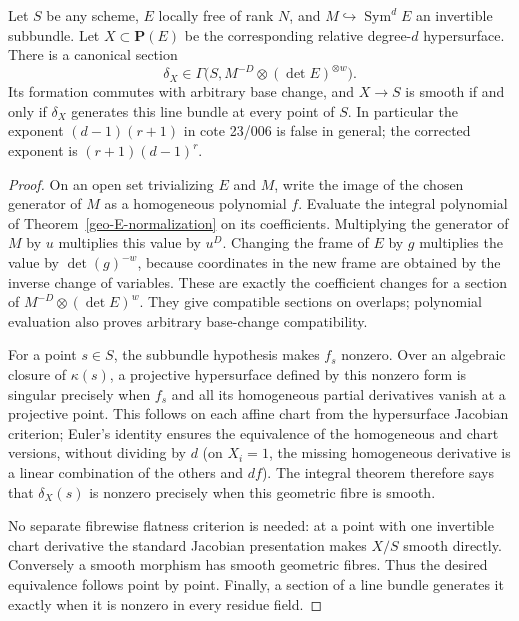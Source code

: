 \begin{theorem}
\label{geo-E-relative}
Let $S$ be any scheme, $E$ locally free of rank $N$, and
$M\hookrightarrow\operatorname{Sym}^d E$ an invertible subbundle. Let
$X\subset\mathbf P(E)$ be the corresponding relative degree-$d$ hypersurface.
There is a canonical section
\[
 \delta_X\in
 \Gamma\bigl(S,M^{-D}\otimes(\det E)^{\otimes w}\bigr).
\]
Its formation commutes with arbitrary base change, and $X\to S$ is smooth
if and only if $\delta_X$ generates this line bundle at every point of $S$.
In particular the exponent $(d-1)(r+1)$ in cote 23/006 is false in general;
the corrected exponent is $(r+1)(d-1)^r$.
\end{theorem}
\begin{proof}
On an open set trivializing $E$ and $M$, write the image of the chosen generator
of $M$ as a homogeneous polynomial $f$. Evaluate the integral polynomial of
Theorem~\ref{geo-E-normalization} on its coefficients. Multiplying the generator
of $M$ by $u$ multiplies this value by $u^D$. Changing the frame of $E$ by $g$
multiplies the value by $\det(g)^{-w}$, because coordinates in the new frame
are obtained by the inverse change of variables. These are exactly the
coefficient changes for a section of $M^{-D}\otimes(\det E)^w$. They give
compatible sections on overlaps; polynomial evaluation also proves arbitrary
base-change compatibility.

For a point $s\in S$, the subbundle hypothesis makes $f_s$ nonzero. Over an
algebraic closure of $\kappa(s)$, a projective hypersurface defined by this
nonzero form is singular precisely when $f_s$ and all its homogeneous partial
derivatives vanish at a projective point. This follows on each affine chart
from the hypersurface Jacobian criterion; Euler's identity ensures the
equivalence of the homogeneous and chart versions, without dividing by $d$
(on $X_i=1$, the missing homogeneous derivative is a linear combination of
the others and $df$). The integral theorem therefore says that $\delta_X(s)$
is nonzero precisely when this geometric fibre is smooth.

No separate fibrewise flatness criterion is needed: at a point with one
invertible chart derivative the standard Jacobian presentation makes $X/S$
smooth directly. Conversely a smooth
morphism has smooth geometric fibres. Thus the desired equivalence follows
point by point. Finally, a section of a line bundle generates it exactly when
it is nonzero in every residue field.
\end{proof}

